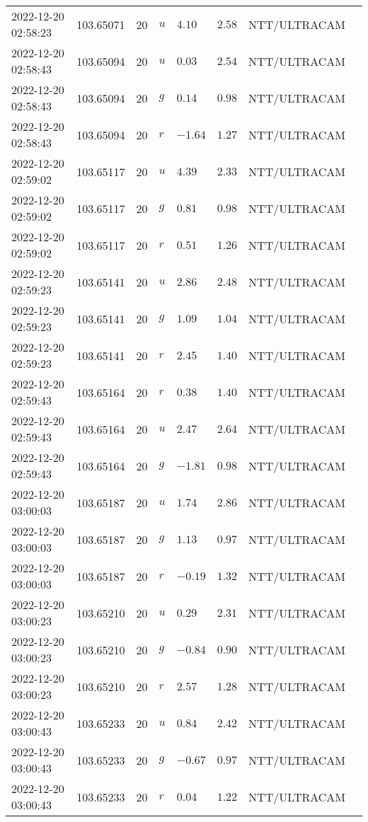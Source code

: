 \documentclass{nature_plusfigure}
\begin{document}
\begin{supplement}
\begin{center}
\begin{longtable}{llllllll}
2022-12-20 02:58:23 & 103.65071 & 20 & $u$ & $4.10$ & $2.58$ & NTT/ULTRACAM &  \\ 
2022-12-20 02:58:43 & 103.65094 & 20 & $u$ & $0.03$ & $2.54$ & NTT/ULTRACAM &  \\ 
2022-12-20 02:58:43 & 103.65094 & 20 & $g$ & $0.14$ & $0.98$ & NTT/ULTRACAM &  \\ 
2022-12-20 02:58:43 & 103.65094 & 20 & $r$ & $-1.64$ & $1.27$ & NTT/ULTRACAM &  \\ 
2022-12-20 02:59:02 & 103.65117 & 20 & $u$ & $4.39$ & $2.33$ & NTT/ULTRACAM &  \\ 
2022-12-20 02:59:02 & 103.65117 & 20 & $g$ & $0.81$ & $0.98$ & NTT/ULTRACAM &  \\ 
2022-12-20 02:59:02 & 103.65117 & 20 & $r$ & $0.51$ & $1.26$ & NTT/ULTRACAM &  \\ 
2022-12-20 02:59:23 & 103.65141 & 20 & $u$ & $2.86$ & $2.48$ & NTT/ULTRACAM &  \\ 
2022-12-20 02:59:23 & 103.65141 & 20 & $g$ & $1.09$ & $1.04$ & NTT/ULTRACAM &  \\ 
2022-12-20 02:59:23 & 103.65141 & 20 & $r$ & $2.45$ & $1.40$ & NTT/ULTRACAM &  \\ 
2022-12-20 02:59:43 & 103.65164 & 20 & $r$ & $0.38$ & $1.40$ & NTT/ULTRACAM &  \\ 
2022-12-20 02:59:43 & 103.65164 & 20 & $u$ & $2.47$ & $2.64$ & NTT/ULTRACAM &  \\ 
2022-12-20 02:59:43 & 103.65164 & 20 & $g$ & $-1.81$ & $0.98$ & NTT/ULTRACAM &  \\ 
2022-12-20 03:00:03 & 103.65187 & 20 & $u$ & $1.74$ & $2.86$ & NTT/ULTRACAM &  \\ 
2022-12-20 03:00:03 & 103.65187 & 20 & $g$ & $1.13$ & $0.97$ & NTT/ULTRACAM &  \\ 
2022-12-20 03:00:03 & 103.65187 & 20 & $r$ & $-0.19$ & $1.32$ & NTT/ULTRACAM &  \\ 
2022-12-20 03:00:23 & 103.65210 & 20 & $u$ & $0.29$ & $2.31$ & NTT/ULTRACAM &  \\ 
2022-12-20 03:00:23 & 103.65210 & 20 & $g$ & $-0.84$ & $0.90$ & NTT/ULTRACAM &  \\ 
2022-12-20 03:00:23 & 103.65210 & 20 & $r$ & $2.57$ & $1.28$ & NTT/ULTRACAM &  \\ 
2022-12-20 03:00:43 & 103.65233 & 20 & $u$ & $0.84$ & $2.42$ & NTT/ULTRACAM &  \\ 
2022-12-20 03:00:43 & 103.65233 & 20 & $g$ & $-0.67$ & $0.97$ & NTT/ULTRACAM &  \\ 
2022-12-20 03:00:43 & 103.65233 & 20 & $r$ & $0.04$ & $1.22$ & NTT/ULTRACAM &  \\ 

\end{longtable}
\end{center}
\end{supplement}
\end{document}
